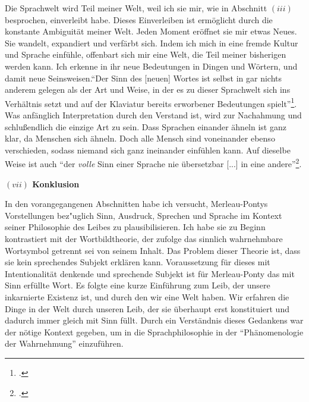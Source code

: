 \documentclass[a4paper, 12pt]{article}
\begin{document}
\begin{onehalfspace}
Die Sprachwelt wird Teil meiner Welt, weil ich sie mir, wie in Abschnitt $(iii)$ besprochen, einverleibt habe. Dieses Einverleiben ist ermöglicht durch die konstante Ambiguität meiner Welt. Jeden Moment eröffnet sie mir etwas Neues. Sie wandelt, expandiert und verfärbt sich. Indem ich mich in eine fremde Kultur und Sprache einfühle, offenbart sich mir eine Welt, die Teil meiner bisherigen werden kann. Ich erkenne in ihr neue Bedeutungen in Dingen und Wörtern, und damit neue Seinsweisen."`Der Sinn des [neuen] Wortes ist selbst in gar nichts anderem gelegen als der Art und Weise, in der es zu dieser Sprachwelt sich ins Verhältnis setzt und auf der Klaviatur bereits erworbener Bedeutungen spielt"'\footnote{\Cite[Siehe][S. 221]{merleau1966phanomenologie}.}. Was anfänglich Interpretation durch den Verstand ist, wird zur Nachahmung und schlußendlich die einzige Art zu sein. Dass Sprachen einander ähneln ist ganz klar, da Menschen sich ähneln. Doch alle Mensch sind voneinander ebenso verschieden, sodass niemand sich ganz ineinander einfühlen kann. Auf dieselbe Weise ist auch "`der \emph{volle} Sinn einer Sprache nie übersetzbar [...] in eine andere"'\footnote{\Cite[Siehe][S. 222]{merleau1966phanomenologie}.}.




\vspace{5mm}

\noindent\textbf{$(vii)$ Konklusion}

\noindent  In den vorangegangenen Abschnitten habe ich versucht, Merleau-Pontys Vorstellungen bez"uglich Sinn, Ausdruck, Sprechen und Sprache im Kontext seiner Philosophie des Leibes zu plausibilisieren. Ich habe sie zu Beginn kontrastiert mit der Wortbildtheorie, der zufolge das sinnlich wahrnehmbare Wortsymbol getrennt sei von seinem Inhalt. Das Problem dieser Theorie ist, dass sie kein sprechendes Subjekt erklären kann. Voraussetzung für dieses mit Intentionalität denkende und sprechende Subjekt ist für Merleau-Ponty das mit Sinn erfüllte Wort. Es folgte eine kurze Einführung zum Leib, der unsere inkarnierte Existenz ist, und durch den wir eine Welt haben. Wir erfahren die Dinge in der Welt durch unseren Leib, der sie überhaupt erst konstituiert und dadurch immer gleich mit Sinn füllt. Durch ein Verständnis dieses Gedankens war der nötige Kontext gegeben, um in die Sprachphilosophie in der "`Phänomenologie der Wahrnehmung"' einzuführen. 


\end{onehalfspace}
\end{document}
